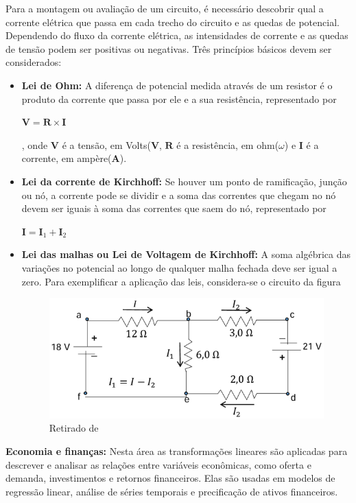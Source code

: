 Para a montagem ou avaliação de um circuito, é necessário descobrir qual a corrente elétrica que passa em cada trecho do circuito e as quedas de potencial. Dependendo do fluxo da corrente elétrica, as intensidades de corrente e as quedas de tensão podem ser positivas ou negativas. Três princípios básicos devem ser considerados:

\begin{itemize}
	\item \textbf{Lei de Ohm:} A diferença de potencial medida através de um resistor é o produto da corrente que passa por ele e a sua resistência, representado por
	
	\centerline{$\mathbf{V} = \mathbf{R} \times \mathbf{I}$},
	onde $\mathbf{V}$ é a tensão, em Volts($\mathbf{V}$, $\mathbf{R}$ é a resistência, em ohm($\omega$) e $\mathbf{I}$ é a corrente, em ampère($\mathbf{A}$).
	
	\item \textbf{Lei da corrente de Kirchhoff:} Se houver um ponto de ramificação, junção ou nó, a corrente pode se dividir e a soma das correntes que chegam no nó devem ser iguais à soma das correntes que saem do nó, representado por
	
	\centerline{$\mathbf{I} = \mathbf{I}_1 + \mathbf{I}_2$}
	
	\item \textbf{Lei das malhas ou Lei de Voltagem de Kirchhoff:} A soma algébrica das variações no potencial ao longo de qualquer malha fechada deve ser igual a zero. Para exemplificar a aplicação das leis, considera-se o circuito da figura
	
	\begin{figure}[H]
		\centering
		\includegraphics[scale=0.90]{a_fg2.png}
		\caption{Retirado de \cite{sirlandro2017}}
	\end{figure}
\end{itemize}

\textbf{Economia e finanças:} Nesta área as transformações lineares são aplicadas para descrever e analisar as relações entre variáveis econômicas, como oferta e demanda, investimentos e retornos financeiros. Elas são usadas em modelos de regressão linear, análise de séries temporais e precificação de ativos financeiros. \nocite{figueiredo2009}

